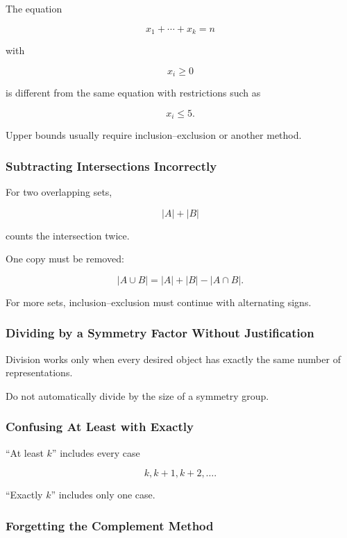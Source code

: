 The equation

\[
x_1+\cdots+x_k=n
\]

with

\[
x_i\geq0
\]

is different from the same equation with restrictions such as

\[
x_i\leq5.
\]

Upper bounds usually require inclusion--exclusion or another method.

\subsubsection{Subtracting Intersections Incorrectly}

For two overlapping sets,

\[
|A|+|B|
\]

counts the intersection twice.

One copy must be removed:

\[
|A\cup B|
=
|A|+|B|-|A\cap B|.
\]

For more sets, inclusion--exclusion must continue with alternating
signs.

\subsubsection{Dividing by a Symmetry Factor Without Justification}

Division works only when every desired object has exactly the same
number of representations.

Do not automatically divide by the size of a symmetry group.

\subsubsection{Confusing At Least with Exactly}

``At least \(k\)'' includes every case

\[
k,k+1,k+2,\ldots.
\]

``Exactly \(k\)'' includes only one case.

\subsubsection{Forgetting the Complement Method}

